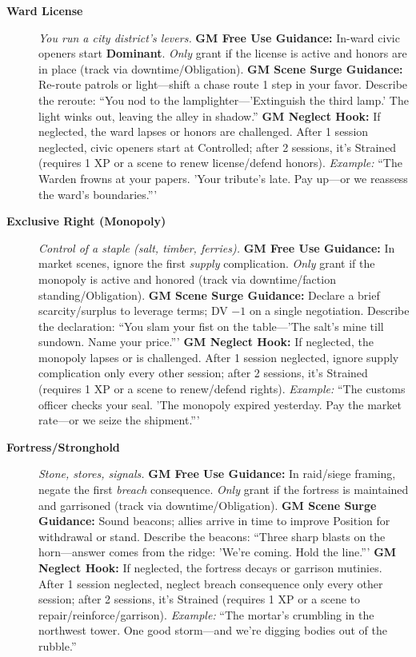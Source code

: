 \begin{description}
  \item[\textbf{Ward License}]   
        \emph{You run a city district's levers.}  
        \textbf{GM Free Use Guidance:} In-ward civic openers start \textbf{Dominant}. \emph{Only} grant if the license is active and honors are in place (track via downtime/Obligation).  
        \textbf{GM Scene Surge Guidance:} Re-route patrols or light---shift a chase route 1 step in your favor. Describe the reroute: ``You nod to the lamplighter---'Extinguish the third lamp.' The light winks out, leaving the alley in shadow.''  
        \textbf{GM Neglect Hook:} If neglected, the ward lapses or honors are challenged. After 1 session neglected, civic openers start at Controlled; after 2 sessions, it's Strained (requires 1 XP or a scene to renew license/defend honors).  
        \textit{Example:} ``The Warden frowns at your papers. 'Your tribute's late. Pay up---or we reassess the ward's boundaries.'''  

  \item[\textbf{Exclusive Right (Monopoly)}]   
        \emph{Control of a staple (salt, timber, ferries).}  
        \textbf{GM Free Use Guidance:} In market scenes, ignore the first \emph{supply} complication. \emph{Only} grant if the monopoly is active and honored (track via downtime/faction standing/Obligation).  
        \textbf{GM Scene Surge Guidance:} Declare a brief scarcity/surplus to leverage terms; DV $-1$ on a single negotiation. Describe the declaration: ``You slam your fist on the table---'The salt's mine till sundown. Name your price.'''  
        \textbf{GM Neglect Hook:} If neglected, the monopoly lapses or is challenged. After 1 session neglected, ignore supply complication only every other session; after 2 sessions, it's Strained (requires 1 XP or a scene to renew/defend rights).  
        \textit{Example:} ``The customs officer checks your seal. 'The monopoly expired yesterday. Pay the market rate---or we seize the shipment.'''  

  \item[\textbf{Fortress/Stronghold}]   
        \emph{Stone, stores, signals.}  
        \textbf{GM Free Use Guidance:} In raid/siege framing, negate the first \emph{breach} consequence. \emph{Only} grant if the fortress is maintained and garrisoned (track via downtime/Obligation).  
        \textbf{GM Scene Surge Guidance:} Sound beacons; allies arrive in time to improve Position for withdrawal or stand. Describe the beacons: ``Three sharp blasts on the horn---answer comes from the ridge: 'We're coming. Hold the line.'''  
        \textbf{GM Neglect Hook:} If neglected, the fortress decays or garrison mutinies. After 1 session neglected, neglect breach consequence only every other session; after 2 sessions, it's Strained (requires 1 XP or a scene to repair/reinforce/garrison).  
        \textit{Example:} ``The mortar's crumbling in the northwest tower. One good storm---and we're digging bodies out of the rubble.''  


\end{description}
